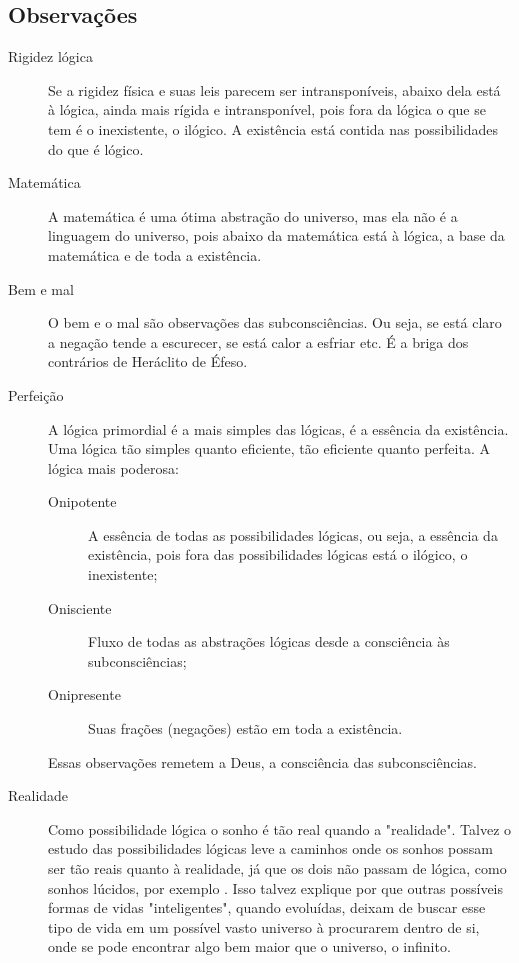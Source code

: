 \subsection{Observações}

\begin{description}
   \item[Rigidez lógica] Se a rigidez física e suas leis parecem ser intransponíveis, abaixo dela está à lógica, ainda mais rígida e intransponível, pois fora da lógica o que se tem é o inexistente, o ilógico. A existência está contida nas possibilidades do que é lógico. 
   \item[Matemática] A matemática é uma ótima abstração do universo, mas ela não é a linguagem do universo, pois abaixo da matemática está à lógica, a base da matemática e de toda a existência.
   \item[Bem e mal] O bem e o mal são observações das subconsciências. Ou seja, se está claro a negação tende a escurecer, se está calor a esfriar etc. É a briga dos contrários de Heráclito de Éfeso.
   \item[Perfeição] A lógica primordial é a mais simples das lógicas, é a essência da existência. Uma lógica tão simples quanto eficiente, tão eficiente quanto perfeita. A lógica mais poderosa:
   \begin{description}
	   \item[Onipotente] A essência de todas as possibilidades lógicas, ou seja, a essência da existência, pois fora das possibilidades lógicas está o ilógico, o inexistente;
	   \item[Onisciente] Fluxo de todas as abstrações lógicas desde a consciência às subconsciências; 
	   \item[Onipresente] Suas frações (negações) estão em toda a existência.
   \end{description}
Essas observações remetem a Deus, a consciência das subconsciências.
   \item[Realidade] Como possibilidade lógica o sonho é tão real quando a "realidade". Talvez o estudo das possibilidades lógicas leve a caminhos onde os sonhos possam ser tão reais quanto à realidade, já que os dois não passam de lógica, como sonhos lúcidos, por exemplo \cite{ administradores_principio_pareto}. Isso talvez explique por que outras possíveis formas de vidas "inteligentes", quando evoluídas, deixam de buscar esse tipo de vida em um possível vasto universo à procurarem dentro de si, onde se pode encontrar algo bem maior que o universo, o infinito.
\end{description}